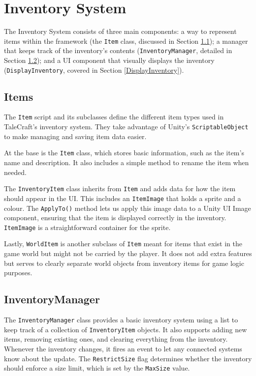 \section{Inventory System}
\label{InventorySystem}
The Inventory System consists of three main components: a way to represent items within the framework (the \verb|Item| class, discussed in Section \ref{Items}); a manager that keeps track of the inventory’s contents (\verb|InventoryManager|, detailed in Section \ref{InventoryManager}); and a UI component that visually displays the inventory (\verb|DisplayInventory|, covered in Section \ref{DisplayInventory}). 

\subsection{Items}
\label{Items}
The \verb|Item| script and its subclasses define the different item types used in TaleCraft’s inventory system. They take advantage of Unity’s \verb|ScriptableObject| to make managing and saving item data easier.

At the base is the \verb|Item| class, which stores basic information, such as the item’s name and description. It also includes a simple method to rename the item when needed.

The \verb|InventoryItem| class inherits from \verb|Item| and adds data for how the item should appear in the UI. This includes an \verb|ItemImage| that holds a sprite and a colour. The \verb|ApplyTo()| method lets us apply this image data to a Unity UI Image component, ensuring that the item is displayed correctly in the inventory. \verb|ItemImage| is a straightforward container for the sprite.

Lastly, \verb|WorldItem| is another subclass of \verb|Item| meant for items that exist in the game world but might not be carried by the player. It does not add extra features but serves to clearly separate world objects from inventory items for game logic purposes.
 
\subsection{InventoryManager}
\label{InventoryManager}
The \verb|InventoryManager| class provides a basic inventory system using a list to keep track of a collection of \verb|InventoryItem| objects. It also supports adding new items, removing existing ones, and clearing everything from the inventory. Whenever the inventory changes, it fires an event to let any connected systems know about the update. The \verb|RestrictSize| flag determines whether the inventory should enforce a size limit, which is set by the \verb|MaxSize| value.

